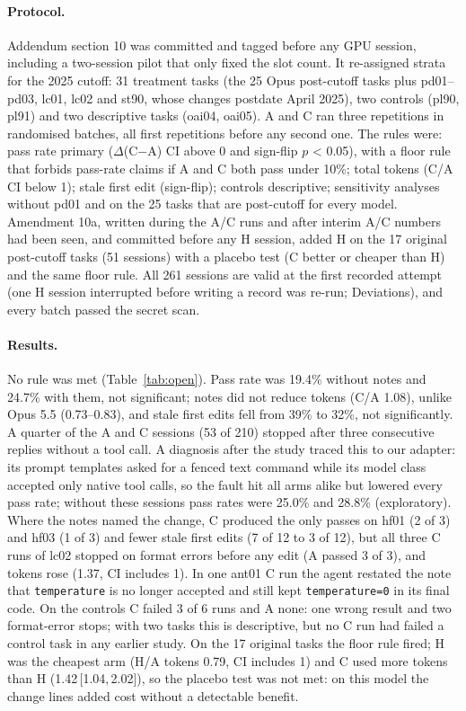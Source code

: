 \documentclass[11pt]{article}
\newcommand{\ci}[2]{\,[#1,\,#2]}
\newcommand{\code}[1]{\texttt{#1}}
\begin{document}
\paragraph{Protocol.}
Addendum section 10 was committed and tagged before any GPU session, including a two-session pilot that only fixed the slot count.
It re-assigned strata for the 2025 cutoff: 31 treatment tasks (the 25 Opus post-cutoff tasks plus pd01--pd03, lc01, lc02 and st90, whose changes postdate April 2025), two controls (pl90, pl91) and two descriptive tasks (oai04, oai05).
A and C ran three repetitions in randomised batches, all first repetitions before any second one.
The rules were: pass rate primary ($\Delta$(C$-$A) CI above 0 and sign-flip $p$ < 0.05), with a floor rule that forbids pass-rate claims if A and C both pass under 10\%; total tokens (C/A CI below 1); stale first edit (sign-flip); controls descriptive; sensitivity analyses without pd01 and on the 25 tasks that are post-cutoff for every model.
Amendment 10a, written during the A/C runs and after interim A/C numbers had been seen, and committed before any H session, added H on the 17 original post-cutoff tasks (51 sessions) with a placebo test (C better or cheaper than H) and the same floor rule.
All 261 sessions are valid at the first recorded attempt (one H session interrupted before writing a record was re-run; Deviations), and every batch passed the secret scan.

\paragraph{Results.}
No rule was met (Table~\ref{tab:open}).
Pass rate was 19.4\% without notes and 24.7\% with them, not significant; notes did not reduce tokens (C/A 1.08), unlike Opus 5.5 (0.73--0.83), and stale first edits fell from 39\% to 32\%, not significantly.
A quarter of the A and C sessions (53 of 210) stopped after three consecutive replies without a tool call. A diagnosis after the study traced this to our adapter: its prompt templates asked for a fenced text command while its model class accepted only native tool calls, so the fault hit all arms alike but lowered every pass rate; without these sessions pass rates were 25.0\% and 28.8\% (exploratory).
Where the notes named the change, C produced the only passes on hf01 (2 of 3) and hf03 (1 of 3) and fewer stale first edits (7 of 12 to 3 of 12), but all three C runs of lc02 stopped on format errors before any edit (A passed 3 of 3), and tokens rose (1.37, CI includes 1).
In one ant01 C run the agent restated the note that \code{temperature} is no longer accepted and still kept \code{temperature=0} in its final code.
On the controls C failed 3 of 6 runs and A none: one wrong result and two format-error stops; with two tasks this is descriptive, but no C run had failed a control task in any earlier study.
On the 17 original tasks the floor rule fired; H was the cheapest arm (H/A tokens 0.79, CI includes 1) and C used more tokens than H (1.42\ci{1.04}{2.02}), so the placebo test was not met: on this model the change lines added cost without a detectable benefit.
\end{document}
